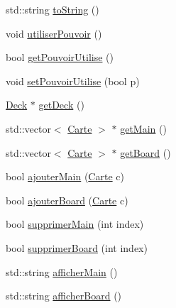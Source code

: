 \begin{DoxyCompactItemize}
\item 
std\-::string \hyperlink{class_joueur_a99e2e0934bb9307f577d9fa3f219a7b6}{to\-String} ()
\item 
void \hyperlink{class_joueur_a91239ad650edadbee5b1b51d19242d28}{utiliser\-Pouvoir} ()
\item 
bool \hyperlink{class_joueur_a0344bd2b30346f73e23239b62647e26d}{get\-Pouvoir\-Utilise} ()
\item 
void \hyperlink{class_joueur_a57f6f8d3ff6ba9b5026a51b23e03cd0a}{set\-Pouvoir\-Utilise} (bool p)
\item 
\hyperlink{class_deck}{Deck} $\ast$ \hyperlink{class_joueur_a5f7a140f00766144edf7d6a5b0f236b7}{get\-Deck} ()
\item 
std\-::vector$<$ \hyperlink{class_carte}{Carte} $>$ $\ast$ \hyperlink{class_joueur_a569fa77a585a0e82981bfa6bda149a4f}{get\-Main} ()
\item 
std\-::vector$<$ \hyperlink{class_carte}{Carte} $>$ $\ast$ \hyperlink{class_joueur_abe6504e86cf56787e5569c296e3bfde7}{get\-Board} ()
\item 
bool \hyperlink{class_joueur_a0b94001f3dd61af944bd7128d143ac11}{ajouter\-Main} (\hyperlink{class_carte}{Carte} c)
\item 
bool \hyperlink{class_joueur_a5046cd3251b93c58558ca273db1aa23b}{ajouter\-Board} (\hyperlink{class_carte}{Carte} c)
\item 
bool \hyperlink{class_joueur_ae1c641d98c6e9fda547c3b7e923f085e}{supprimer\-Main} (int index)
\item 
bool \hyperlink{class_joueur_af086855b254a628bc9c07047142fb33c}{supprimer\-Board} (int index)
\item 
std\-::string \hyperlink{class_joueur_a4a41ec6aaa2e7b4a55807b86cc286876}{afficher\-Main} ()
\item 
std\-::string \hyperlink{class_joueur_aae890e668b097dddee94a61404553c8f}{afficher\-Board} ()
\end{DoxyCompactItemize}


